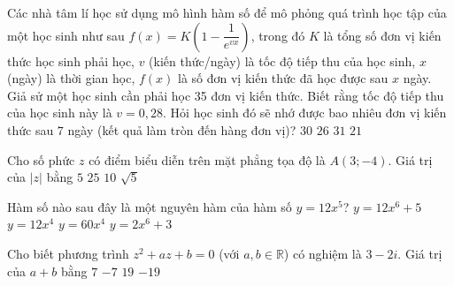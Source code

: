 \begin{ex}%
	Các nhà tâm lí học sử dụng mô hình hàm số để mô phỏng quá trình học tập của một học sinh như sau $f(x)=K\left(1-\dfrac{1}{e^{vx}}\right)$, trong đó $K$ là tổng số đơn vị kiến thức học sinh phải học, $v$ (kiến thức/ngày) là tốc độ tiếp thu của học sinh, $x$ (ngày) là thời gian học, $f(x)$ là số đơn vị kiến thức đã học được sau $x$ ngày. Giả sử một học sinh cần phải học 35 đơn vị kiến thức. Biết rằng tốc độ tiếp thu của học sinh này là $v=0{,}28$. Hỏi học sinh đó sẽ nhớ được bao nhiêu đơn vị kiến thức sau $7$ ngày (kết quả làm tròn đến hàng đơn vị)?
	\choice
	{\True $30$}
	{$26$}
	{$31$}
	{$21$}
\end{ex}

\begin{ex}%
	Cho số phức $z$ có điểm biểu diễn trên mặt phẳng tọa độ là $A(3;-4)$. Giá trị của $ |z|$ bằng
	\choice
	{\True $5$}
	{$25$}
	{$10$}
	{$\sqrt{5}$}
\end{ex}

\begin{ex}%
	Hàm số nào sau đây là một nguyên hàm của hàm số $y=12x^5$?
	\choice
	{$y=12x^6+5$}
	{$y=12x^4$}
	{$y=60x^4$}
	{\True $y=2x^6+3$}
\end{ex}

\begin{ex}%
	Cho biết phương trình $z^2+az+b=0$ (với $a,b\in\mathbb{R}$) có nghiệm là $3-2i$. Giá trị của $a+b$ bằng
	\choice
	{\True $7$}
	{$-7$}
	{$19$}
	{$-19$}
\end{ex}

